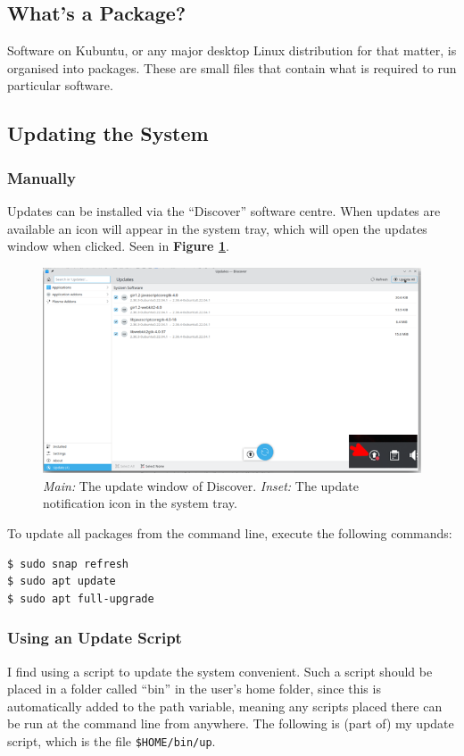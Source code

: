 \documentclass[a4paper, 12pt]{article}
\begin{document}
\subsection{What's a Package?}

Software on Kubuntu, or any major desktop Linux distribution for that matter, is organised into packages. These are small files that contain what is required to run particular software.

\subsection{Updating the System}

\subsubsection{Manually}
Updates can be installed via the ``Discover'' software centre. When updates are available an icon will appear in the system tray, which will open the updates window when clicked. Seen in \textbf{Figure \ref{fig:updates}}.

\begin{figure}[h]
    \centering
    \includegraphics[width=0.6\linewidth]{images/updates}
    \caption{\textit{Main:} The update window of Discover. \textit{Inset:} The update notification icon in the system tray.}\label{fig:updates}
\end{figure}


 To update all packages from the command line, execute the following commands:
\begin{lstlisting}
$ sudo snap refresh
$ sudo apt update
$ sudo apt full-upgrade
\end{lstlisting}

\subsubsection{Using an Update Script}
I find using a script to update the system convenient. Such a script should be placed in a folder called ``bin'' in the user's home folder, since this is automatically added to the path variable, meaning any scripts placed there can be run at the command line from anywhere. The following is (part of) my update script, which is the file \texttt{\$HOME/bin/up}.
\end{document}
